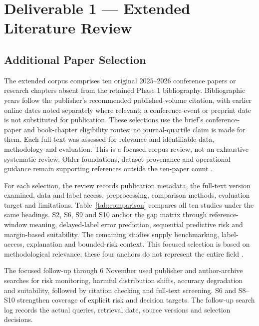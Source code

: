 \documentclass[11pt,a4paper]{article}
\begin{document}
\section*{Deliverable 1 --- Extended Literature Review}
\subsection*{Additional Paper Selection}
The extended corpus comprises ten original 2025--2026 conference papers or
research chapters absent from the retained Phase 1 bibliography. Bibliographic years follow the
publisher's recommended published-volume citation, with earlier online dates
noted separately where relevant; a conference-event or preprint date is not
substituted for publication. These selections use the brief's conference-paper and book-chapter
eligibility routes; no journal-quartile claim is made for them. Each full text
was assessed for relevance and identifiable data, methodology and evaluation.
This is a focused corpus review, not an exhaustive systematic review. Older
foundations, dataset provenance and operational guidance remain supporting references outside the
ten-paper count \cite{cerqueira,window,pudd,batched,causal,prodem,conformal,timans,pprm,suitability}.

For each selection, the review records publication metadata, the full-text
version examined, data and label access, preprocessing, comparison methods,
evaluation target and limitations. Table~\ref{tab:comparison} compares all ten
studies under the same headings. S2, S6, S9 and S10 anchor the gap matrix
through reference-window meaning, delayed-label error prediction, sequential
predictive risk and margin-based suitability. The remaining studies supply
benchmarking, label-access, explanation and bounded-risk context. This focused
selection is based on methodological relevance; these four anchors do not
represent the entire field \cite{window,prodem,pprm,suitability}.

The focused follow-up through 6 November used publisher and author-archive searches for risk
monitoring, harmful distribution shifts, accuracy degradation and suitability,
followed by citation checking and full-text screening. S6 and S8--S10 strengthen
coverage of explicit risk and decision targets. The follow-up search log records the actual
queries, retrieval date, source versions and selection decisions.
\end{document}
